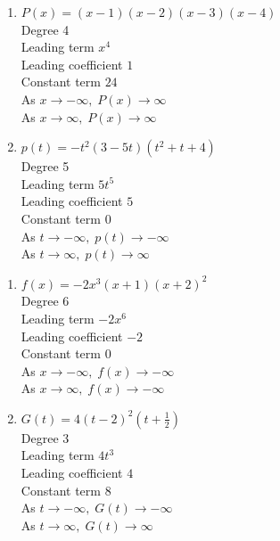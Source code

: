 \begin{multicols}{2}
\begin{enumerate}
\setcounter{enumi}{\value{HW}}


\item $P(x) = (x - 1)(x - 2)(x - 3)(x - 4)$\\
Degree 4 \\
Leading term $x^{4}$\\
Leading coefficient $1$\\
Constant term $24$\\
As $x \rightarrow -\infty, \; P(x) \rightarrow \infty$\\
As $x \rightarrow \infty, \; P(x) \rightarrow \infty$\\

\item $p(t) = -t^2(3 - 5t)(t^{2} + t + 4)$\\
Degree 5 \\
Leading term $5t^{5}$\\
Leading coefficient $5$\\
Constant term $0$\\
As $t \rightarrow -\infty, \; p(t) \rightarrow -\infty$\\
As $t \rightarrow \infty, \; p(t) \rightarrow \infty$\\

\setcounter{HW}{\value{enumi}}
\end{enumerate}
\end{multicols}



\begin{multicols}{2}
\begin{enumerate}
\setcounter{enumi}{\value{HW}}

\item $f(x) = -2x^3(x+1)(x+2)^2$ \\
Degree 6 \\
Leading term $-2x^{6}$\\
Leading coefficient $-2$\\
Constant term $0$\\
As $x \rightarrow -\infty, \; f(x) \rightarrow -\infty$\\
As $x \rightarrow \infty, \; f(x) \rightarrow -\infty$\\

\item $G(t) = 4(t-2)^2\left(t+\frac{1}{2}\right)$ \\
Degree 3 \\
Leading term $4t^3$\\
Leading coefficient $4$\\
Constant term $8$\\
As $t \rightarrow -\infty, \; G(t) \rightarrow -\infty$\\
As $t \rightarrow \infty, \; G(t) \rightarrow \infty$\\

\setcounter{HW}{\value{enumi}}
\end{enumerate}
\end{multicols}

